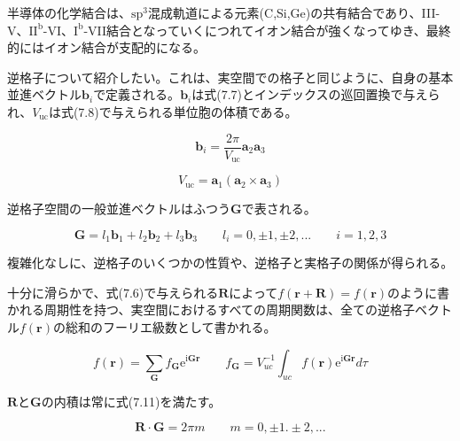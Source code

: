 \documentclass[11pt,a4j,uplatex]{jsarticle}
\begin{document}
半導体の化学結合は、$\mathrm{sp}^3$混成軌道による元素(C,Si,Ge)の共有結合であり、I\hspace{-1pt}I\hspace{-1pt}I-V、I\hspace{-1pt}$\mathrm{I}^{\mathrm{b}}$-V\hspace{-1pt}I、$\mathrm{I}^{\mathrm{b}}$-V\hspace{-1pt}I\hspace{-1pt}I結合となっていくにつれてイオン結合が強くなってゆき、最終的にはイオン結合が支配的になる。

逆格子について紹介したい。これは、実空間での格子と同じように、自身の基本並進ベクトル$\bm{b}_i$で定義される。$\bm{b}_i$は式(7.7)とインデックスの巡回置換で与えられ、$V_{\mathrm{uc}}$は式(7.8)で与えられる単位胞の体積である。

\begin{equation}
  \bm{b}_i=\frac{2\pi}{V_{\mathrm{uc}}}\bm{a}_2\bm{a}_3\tag{7.7}
\end{equation}

\begin{equation}
  V_{\mathrm{uc}}=\bm{a}_1(\bm{a}_2\times\bm{a}_3)\tag{7.8}
\end{equation}

逆格子空間の一般並進ベクトルはふつう$\bm{G}$で表される。

\begin{equation}
  \bm{G}=l_1\bm{b}_1+l_2\bm{b}_2+l_3\bm{b}_3\qquad l_i=0,\pm1,\pm2,...\qquad i=1,2,3\tag{7.9}
\end{equation}

複雑化なしに、逆格子のいくつかの性質や、逆格子と実格子の関係が得られる。

十分に滑らかで、式(7.6)で与えられる$\bm{R}$によって$f(\bm{r}+\bm{R})=f(\bm{r})$のように書かれる周期性を持つ、実空間におけるすべての周期関数は、全ての逆格子ベクトル$f(\bm{r})$の総和のフーリエ級数として書かれる。

\begin{equation}
  f(\bm{r})=\sum_{\bm{G}}f_{\bm{G}}\mathrm{e}^{\mathrm{i}\bm{Gr}}\qquad f_{\bm{G}}=V_{uc}^{-1}\int_{uc}f(\bm{r})\mathrm{e}^{\mathrm{i}\bm{Gr}}d\tau\tag{7.10}
\end{equation}

$\bm{R}$と$\bm{G}$の内積は常に式(7.11)を満たす。

\begin{equation}
  \bm{R}\cdot\bm{G}=2\pi m\qquad m=0,\pm1.\pm2,...\tag{7.11}
\end{equation}
\end{document}
